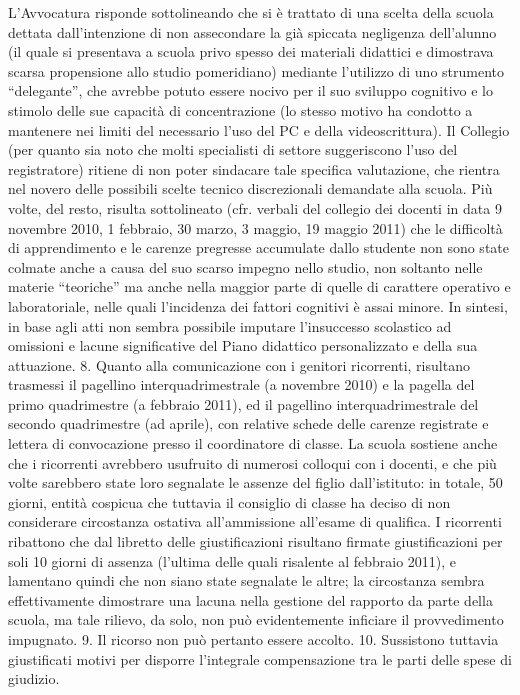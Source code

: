 L’Avvocatura risponde sottolineando che si è trattato di una scelta della scuola dettata dall’intenzione di non assecondare la già spiccata negligenza dell’alunno (il quale si presentava a scuola privo spesso dei materiali didattici e dimostrava scarsa propensione allo studio pomeridiano) mediante l’utilizzo di uno strumento “delegante”, che avrebbe potuto essere nocivo per il suo sviluppo cognitivo e lo stimolo delle sue capacità di concentrazione (lo stesso motivo ha condotto a mantenere nei limiti del necessario l’uso del PC e della videoscrittura).
Il Collegio (per quanto sia noto che molti specialisti di settore suggeriscono l’uso del registratore) ritiene di non poter sindacare tale specifica valutazione, che rientra nel novero delle possibili scelte tecnico discrezionali demandate alla scuola.
Più volte, del resto, risulta sottolineato (cfr. verbali del collegio dei docenti in data 9 novembre 2010, 1 febbraio, 30 marzo, 3 maggio, 19 maggio 2011) che le difficoltà di apprendimento e le carenze pregresse accumulate dallo studente non sono state colmate anche a causa del suo scarso impegno nello studio, non soltanto nelle materie “teoriche” ma anche nella maggior parte di quelle di carattere operativo e laboratoriale, nelle quali l’incidenza dei fattori cognitivi è assai minore.
In sintesi, in base agli atti non sembra possibile imputare l’insuccesso scolastico ad omissioni e lacune significative del Piano didattico personalizzato e della sua attuazione.
8. Quanto alla comunicazione con i genitori ricorrenti, risultano trasmessi il pagellino interquadrimestrale (a novembre 2010) e la pagella del primo quadrimestre (a febbraio 2011), ed il pagellino interquadrimestrale del secondo quadrimestre (ad aprile), con relative schede delle carenze registrate e lettera di convocazione presso il coordinatore di classe. La scuola sostiene anche che i ricorrenti avrebbero usufruito di numerosi colloqui con i docenti, e che più volte sarebbero state loro segnalate le assenze del figlio dall’istituto: in totale, 50 giorni, entità cospicua che tuttavia il consiglio di classe ha deciso di non considerare circostanza ostativa all’ammissione all’esame di qualifica. I ricorrenti ribattono che dal libretto delle giustificazioni risultano firmate giustificazioni per soli 10 giorni di assenza (l’ultima delle quali risalente al febbraio 2011), e lamentano quindi che non siano state segnalate le altre; la circostanza sembra effettivamente dimostrare una lacuna nella gestione del rapporto da parte della scuola, ma tale rilievo, da solo, non può evidentemente inficiare il provvedimento impugnato.
9. Il ricorso non può pertanto essere accolto.
10. Sussistono tuttavia giustificati motivi per disporre l’integrale compensazione tra le parti delle spese di giudizio.

